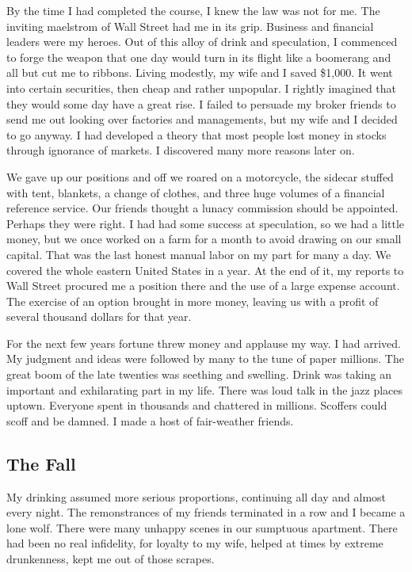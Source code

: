 By the time I had completed the course, I knew the law was not for me.
The inviting maelstrom of Wall Street had me in its grip.
Business and financial leaders were my heroes.
Out of this alloy of drink and speculation, I commenced to forge the weapon that one day would turn in its flight like a boomerang and all but cut me to ribbons.
Living modestly, my wife and I saved \$1,000.
It went into certain securities, then cheap and rather unpopular.
I rightly imagined that they would some day have a great rise.
I failed to persuade my broker friends to send me out looking over factories and managements, but my wife and I decided to go anyway.
I had developed a theory that most people lost money in stocks through ignorance of markets.
I discovered many more reasons later on.

We gave up our positions and off we roared on a motorcycle, the sidecar stuffed with tent, blankets, a change of clothes, and three huge volumes of a financial reference service.
Our friends thought a lunacy commission should be appointed.
Perhaps they were right.
I had had some success at speculation, so we had a little money, but we once worked on a farm for a month to avoid drawing on our small capital.
That was the last honest manual labor on my part for many a day.
We covered the whole eastern United States in a year.
At the end of it, my reports to Wall Street procured me a position there and the use of a large expense account.
The exercise of an option brought in more money, leaving us with a profit of several thousand dollars for that year.

For the next few years fortune threw money and applause my way.
I had arrived.
My judgment and ideas were followed by many to the tune of paper millions.
The great boom of the late twenties was seething and swelling.
Drink was taking an important and exhilarating part in my life.
There was loud talk in the jazz places uptown.
Everyone spent in thousands and chattered in millions.
Scoffers could scoff and be damned.
I made a host of fair-weather friends.


\subsection{The Fall}

My drinking assumed more serious proportions, continuing all day and almost every night.
The remonstrances of my friends terminated in a row and I became a lone wolf.
There were many unhappy scenes in our sumptuous apartment.
There had been no real infidelity, for loyalty to my wife, helped at times by extreme drunkenness, kept me out of those scrapes.

